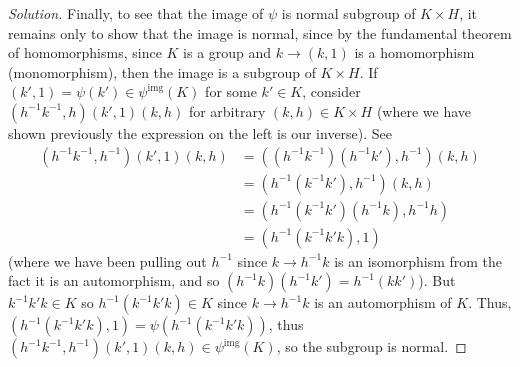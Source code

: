 \documentclass{article}
\begin{document}
\begin{proof}[Solution]
	Finally, to see that the image of $\psi$ is normal subgroup of $K \times H$,
	it remains only to show that the image is normal,
	since by the fundamental theorem of homomorphisms,
	since $K$ is a group and $k \to (k,1)$ is a homomorphism (monomorphism),
	then the image is a subgroup of $K \times H$.
	If $(k',1) = \psi(k') \in \psi^{\mathrm{img}}(K)$ for some $k' \in K$,
	consider $(h^{-1}k^{-1},h)(k',1)(k,h)$ for arbitrary $(k,h) \in K \times H$
	(where we have shown previously the expression on the left is our inverse).
	See
	\begin{align*}
		(h^{-1}k^{-1},h^{-1})(k',1)(k,h)
		&= ((h^{-1}k^{-1})(h^{-1}k'), h^{-1})(k,h)\\
		&= (h^{-1}(k^{-1}k'), h^{-1})(k,h)\\
		&= (h^{-1}(k^{-1}k')(h^{-1}k), h^{-1}h)\\
		&= (h^{-1}(k^{-1}k'k), 1)
	\end{align*}
	(where we have been pulling out $h^{-1}$ since
	$k \to h^{-1}k$ is an isomorphism from the fact it is an automorphism,
	and so $(h^{-1}k)(h^{-1}k') = h^{-1}(kk')$).
	But $k^{-1}k'k \in K$ so $h^{-1}(k^{-1}k'k)\in K$
	since $k \to h^{-1}k$ is an automorphism of $K$.
	Thus, $(h^{-1}(k^{-1}k'k), 1) = \psi(h^{-1}(k^{-1}k'k))$,
	thus $(h^{-1}k^{-1},h^{-1})(k',1)(k,h) \in \psi^{\mathrm{img}}(K)$,
	so the subgroup is normal.
\end{proof}
\end{document}

